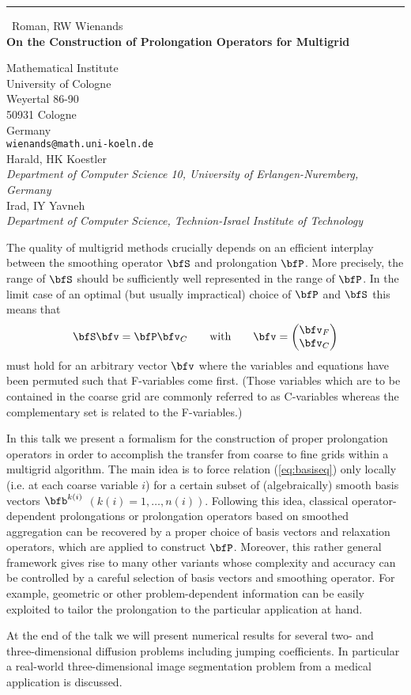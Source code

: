 \documentclass{report}
\begin{document}
\begin{center}
\rule{6in}{1pt} \
{\large Roman, RW Wienands \\
{\bf On the Construction of Prolongation Operators for Multigrid}}

Mathematical Institute \\ University of Cologne \\ Weyertal 86-90 \\ 50931 Cologne \\ Germany
\\
{\tt wienands@math.uni-koeln.de}\\
Harald, HK Koestler\\
{\em Department of Computer Science 10, University of Erlangen-Nuremberg, Germany}\\
Irad, IY Yavneh\\
{\em Department of Computer Science, Technion-Israel Institute of Technology}\end{center}

The quality of multigrid methods crucially depends on an efficient
interplay between the smoothing operator $\bfS$ and prolongation $\bfP$.
More precisely, the range of $\bfS$ should be sufficiently well
represented in the range of $\bfP$. In the limit case of an optimal (but
usually impractical) choice of $\bfP$ and $\bfS$ this means that
\begin{equation}
\bfS \bfv = \bfP \bfv_{C} \qquad \text{with}
\qquad \bfv = \left( \begin{matrix} \bfv_{F} \\ \bfv_{C}
\end{matrix} \right) \label{eq:basiseq}
\end{equation}
must hold for an arbitrary vector $\bfv$ where the variables and
equations have been permuted such that F-variables come first.
(Those variables which are to be contained in the coarse grid are
commonly referred to as C-variables whereas the complementary set is
related to the F-variables.)

In this talk we present a formalism for the construction of proper
prolongation operators in order to accomplish the transfer from coarse to
fine grids within a multigrid algorithm. The main idea is to force
relation
(\ref{eq:basiseq}) only locally (i.e. at each coarse variable $i$) for a
certain subset of (algebraically) smooth basis vectors $\bfb^{k(i)}$
$(k(i) = 1,\dots,n(i))$. Following this
idea, classical operator-dependent prolongations or prolongation
operators based on smoothed aggregation can be recovered by a proper
choice of basis vectors and relaxation operators, which are applied to
construct $\bfP$. Moreover, this rather general framework gives rise to
many other variants whose complexity and accuracy can be controlled by a
careful selection of basis vectors and smoothing operator. For example,
geometric or other problem-dependent information can be easily exploited
to tailor the prolongation to the particular application at hand.

At the end of the talk we will present numerical results for several two-
and three-dimensional diffusion problems including jumping coefficients.
In particular a real-world three-dimensional image segmentation problem
from a medical application is discussed.
\end{document}
